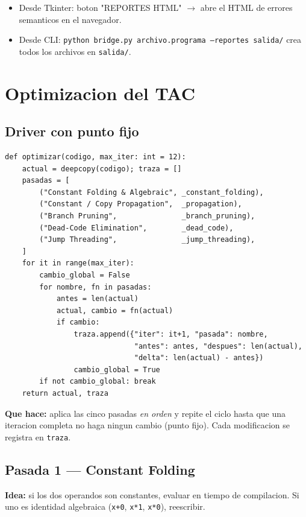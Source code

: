 \documentclass[11pt,a4paper]{article}
\begin{document}
\begin{itemize}[leftmargin=*,nosep]
  \item Desde Tkinter: boton "REPORTES HTML" $\rightarrow$ abre el HTML
        de errores semanticos en el navegador.
  \item Desde CLI: \texttt{python bridge.py archivo.programa --reportes salida/}
        crea todos los archivos en \texttt{salida/}.
\end{itemize}

\section{Optimizacion del TAC}

\subsection{Driver con punto fijo}

\begin{lstlisting}[style=py]
def optimizar(codigo, max_iter: int = 12):
    actual = deepcopy(codigo); traza = []
    pasadas = [
        ("Constant Folding & Algebraic", _constant_folding),
        ("Constant / Copy Propagation",  _propagation),
        ("Branch Pruning",               _branch_pruning),
        ("Dead-Code Elimination",        _dead_code),
        ("Jump Threading",               _jump_threading),
    ]
    for it in range(max_iter):
        cambio_global = False
        for nombre, fn in pasadas:
            antes = len(actual)
            actual, cambio = fn(actual)
            if cambio:
                traza.append({"iter": it+1, "pasada": nombre,
                              "antes": antes, "despues": len(actual),
                              "delta": len(actual) - antes})
                cambio_global = True
        if not cambio_global: break
    return actual, traza
\end{lstlisting}

\textbf{Que hace:} aplica las cinco pasadas \emph{en orden} y repite el
ciclo hasta que una iteracion completa no haga ningun cambio (punto
fijo). Cada modificacion se registra en \texttt{traza}.

\subsection{Pasada 1 --- Constant Folding}

\textbf{Idea:} si los dos operandos son constantes, evaluar en tiempo
de compilacion. Si uno es identidad algebraica (\texttt{x+0},
\texttt{x*1}, \texttt{x*0}), reescribir.
\end{document}
